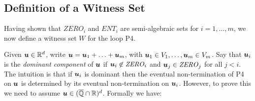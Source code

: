 \subsection{Definition of a Witness Set}
Having shown that $\mathit{ZERO}_i$ and $\mathit{ENT}_i$ are
semi-algebraic sets for $i=1,\ldots,m$, we now define a witness set
$W$ for the loop \textsf{P4}.

Given $\boldsymbol{u} \in \mathbb{R}^{d}$, write $\boldsymbol{u}=
\boldsymbol{u}_1+\ldots+\boldsymbol{u}_m$, with $\boldsymbol{u}_1 \in
V_1,\ldots,\boldsymbol{u}_m\in V_m$.  Say that $\boldsymbol{u}_i$ is
the \emph{dominant component} of $\boldsymbol{u}$ if
$\boldsymbol{u}_i\not\in \mathit{ZERO}_i$ and
$\boldsymbol{u}_j\in\mathit{ZERO}_j$ for all $j<i$.  The intuition is
that if $\boldsymbol{u}_i$ is dominant then the eventual
non-termination of \textsf{P4} on $\boldsymbol{u}$ is determined by
its eventual non-termination on $\boldsymbol{u}_i$.  However, to prove
this we need to assume $\boldsymbol{u}\in (\overline{\mathbb{Q}}\cap\mathbb{R})^{d}$.  Formally we
have:

